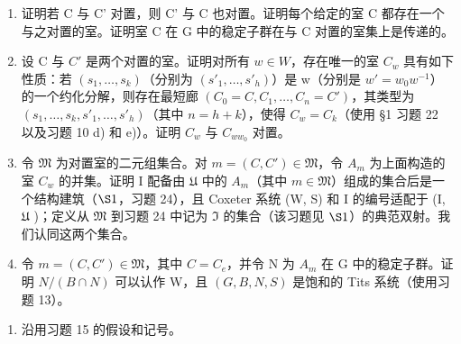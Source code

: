 \begin{enumerate}
\def\labelenumi{\alph{enumi})}
\item
  证明若 C 与 C' 对置，则 C' 与 C 也对置。证明每个给定的室 C 都存在一个与之对置的室。证明室 C 在 G 中的稳定子群在与 C 对置的室集上是传递的。
\item
  设 C 与 \(C'\) 是两个对置的室。证明对所有 \(w \in W\)，存在唯一的室 \(C_w\) 具有如下性质：若 \((s_1, \ldots, s_k)\)（分别为 \((s'_1, \ldots, s'_h)\)）是 w（分别是 \(w' = w_0 w^{-1}\)）的一个约化分解，则存在最短廊 \((C_0 = C, C_1, \ldots, C_n = C')\)，其类型为 \((s_1, \ldots, s_k, s'_1, \ldots, s'_h)\)（其中 \(n = h + k\)），使得 \(C_w = C_k\)（使用 §1 习题 22 以及习题 10 d) 和 e)）。证明 \(C_w\) 与 \(C_{ww_0}\) 对置。
\item
  令 \(\mathfrak{M}\) 为对置室的二元组集合。对 \(m = (C, C') \in \mathfrak{M}\)，令 \(A_m\) 为上面构造的室 \(C_w\) 的并集。证明 I 配备由 \(\mathfrak{U}\) 中的 \(A_m\)（其中 \(m \in \mathfrak{M}\)）组成的集合后是一个结构建筑（\(\S 1\)，习题 24），且 Coxeter 系统 (W, S) 和 I 的编号适配于 (I, \(\mathfrak{U}\) )；定义从 \(\mathfrak{M}\) 到习题 24 中记为 \(\mathfrak{I}\) 的集合（该习题见 \(\S 1\)）的典范双射。我们认同这两个集合。
\item
  令 \(m = (C, C') \in \mathfrak{M}\)，其中 \(C = C_e\)，并令 N 为 \(A_m\) 在 G 中的稳定子群。证明 \(N/(B \cap N)\) 可以认作 W，且 \((G, B, N, S)\) 是饱和的 Tits 系统（使用习题 13）。
\end{enumerate}

\begin{enumerate}
\def\labelenumi{\arabic{enumi})}
\setcounter{enumi}{15}
\tightlist
\item
  沿用习题 15 的假设和记号。
\end{enumerate}

